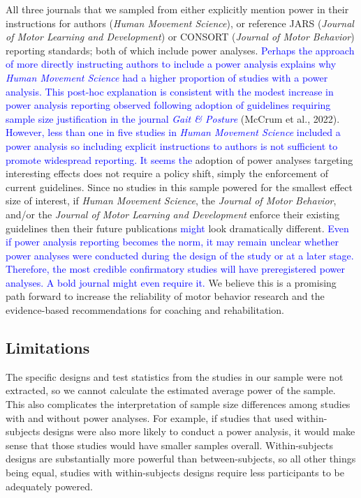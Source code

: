 \documentclass[
  man, donotrepeattitle,mask,floatsintext]{apa7}
\begin{document}
All three journals that we sampled from either explicitly mention power in their instructions for authors (\emph{Human Movement Science}), or reference JARS (\emph{Journal of Motor Learning and Development}) or CONSORT (\emph{Journal of Motor Behavior}) reporting standards; both of which include power analyses. \textcolor{blue}{Perhaps the approach of more directly instructing authors to include a power analysis explains why \emph{Human Movement Science} had a higher proportion of studies with a power analysis. This post-hoc explanation is consistent with the modest increase in power analysis reporting observed following adoption of guidelines requiring sample size justification in the journal \emph{Gait \& Posture}} (McCrum et al., 2022). \textcolor{blue}{ However, less than one in five studies in \emph{Human Movement Science} included a power analysis so including explicit instructions to authors is not sufficient to promote widespread reporting. It seems the} adoption of power analyses targeting interesting effects does not require a policy shift, simply the enforcement of current guidelines. Since no studies in this sample powered for the smallest effect size of interest, if \emph{Human Movement Science}, the \emph{Journal of Motor Behavior}, and/or the \emph{Journal of Motor Learning and Development} enforce their existing guidelines then their future publications \textcolor{blue}{might} look dramatically different. \textcolor{blue}{Even if power analysis reporting becomes the norm, it may remain unclear whether power analyses were conducted during the design of the study or at a later stage. Therefore, the most credible confirmatory studies will have preregistered power analyses. A bold journal might even require it.} We believe this is a promising path forward to increase the reliability of motor behavior research and the evidence-based recommendations for coaching and rehabilitation.

\hypertarget{limitations}{%
\subsection{Limitations}\label{limitations}}

The specific designs and test statistics from the studies in our sample were not extracted, so we cannot calculate the estimated average power of the sample. This also complicates the interpretation of sample size differences among studies with and without power analyses. For example, if studies that used within-subjects designs were also more likely to conduct a power analysis, it would make sense that those studies would have smaller samples overall. Within-subjects designs are substantially more powerful than between-subjects, so all other things being equal, studies with within-subjects designs require less participants to be adequately powered.
\end{document}
